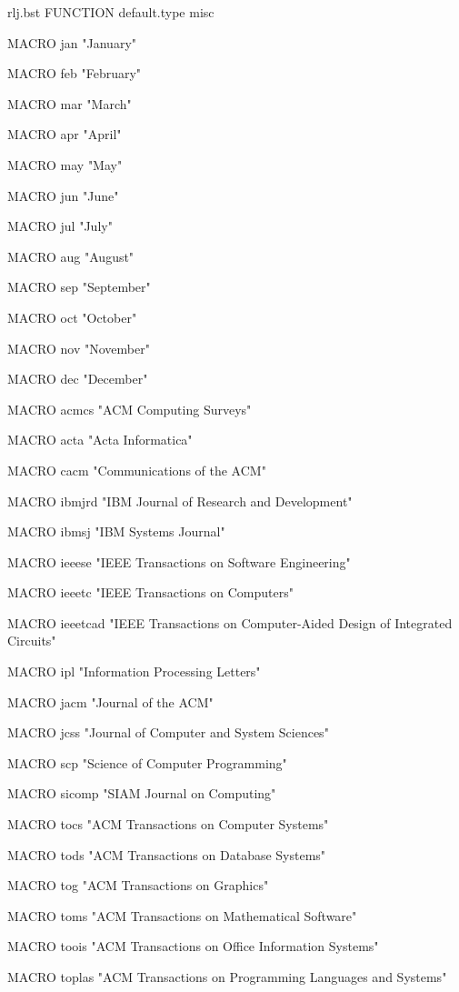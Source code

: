 \begin{filecontents*}{rlj.bst}
FUNCTION {default.type} { misc }


MACRO {jan} {"January"}

MACRO {feb} {"February"}

MACRO {mar} {"March"}

MACRO {apr} {"April"}

MACRO {may} {"May"}

MACRO {jun} {"June"}

MACRO {jul} {"July"}

MACRO {aug} {"August"}

MACRO {sep} {"September"}

MACRO {oct} {"October"}

MACRO {nov} {"November"}

MACRO {dec} {"December"}



MACRO {acmcs} {"ACM Computing Surveys"}

MACRO {acta} {"Acta Informatica"}

MACRO {cacm} {"Communications of the ACM"}

MACRO {ibmjrd} {"IBM Journal of Research and Development"}

MACRO {ibmsj} {"IBM Systems Journal"}

MACRO {ieeese} {"IEEE Transactions on Software Engineering"}

MACRO {ieeetc} {"IEEE Transactions on Computers"}

MACRO {ieeetcad}
 {"IEEE Transactions on Computer-Aided Design of Integrated Circuits"}

MACRO {ipl} {"Information Processing Letters"}

MACRO {jacm} {"Journal of the ACM"}

MACRO {jcss} {"Journal of Computer and System Sciences"}

MACRO {scp} {"Science of Computer Programming"}

MACRO {sicomp} {"SIAM Journal on Computing"}

MACRO {tocs} {"ACM Transactions on Computer Systems"}

MACRO {tods} {"ACM Transactions on Database Systems"}

MACRO {tog} {"ACM Transactions on Graphics"}

MACRO {toms} {"ACM Transactions on Mathematical Software"}

MACRO {toois} {"ACM Transactions on Office Information Systems"}

MACRO {toplas} {"ACM Transactions on Programming Languages and Systems"}


\end{filecontents*}
